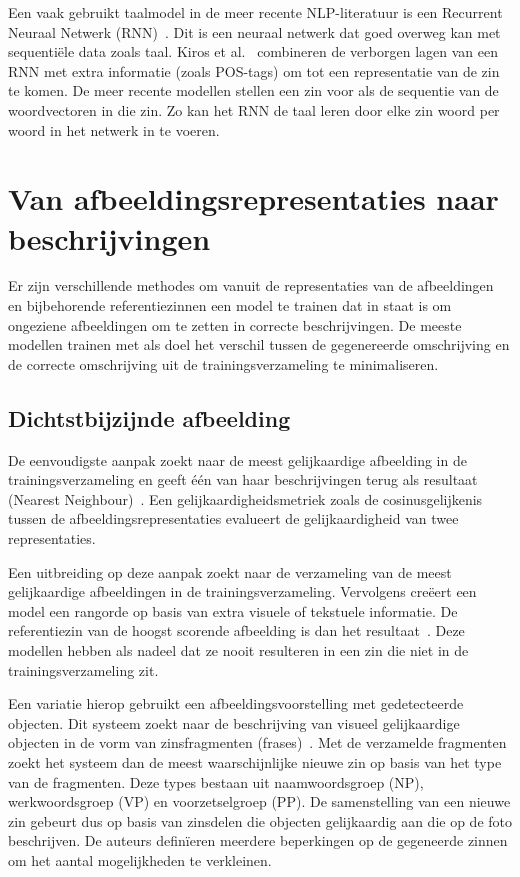  Een vaak gebruikt taalmodel in de meer recente NLP-literatuur is een Recurrent Neuraal Netwerk (RNN)~\cite{Mikolov2010}. Dit is een neuraal netwerk dat goed overweg kan met sequenti\"ele data zoals taal. Kiros et al.~\cite{Kiros2013} combineren de verborgen lagen van een RNN met extra informatie (zoals POS-tags) om tot een representatie van de zin te komen. De meer recente modellen stellen een zin voor als de sequentie van de woordvectoren in die zin. Zo kan het RNN de taal leren door elke zin woord per woord in het netwerk in te voeren.
 
\section{Van afbeeldingsrepresentaties naar beschrijvingen}
Er zijn verschillende methodes om vanuit de representaties van de afbeeldingen en bijbehorende referentiezinnen een model te trainen dat in staat is om ongeziene afbeeldingen om te zetten in correcte beschrijvingen. 
De meeste modellen trainen met als doel het verschil tussen de gegenereerde omschrijving en de correcte omschrijving uit de trainingsverzameling te minimaliseren.

\subsection{Dichtstbijzijnde afbeelding}
De eenvoudigste aanpak zoekt naar de meest gelijkaardige afbeelding in de trainingsverzameling en geeft \'e\'en van haar beschrijvingen terug als resultaat (Nearest Neighbour)~\cite{Devlin2015a}. Een gelijkaardigheidsmetriek zoals de cosinusgelijkenis tussen de afbeeldingsrepresentaties evalueert de gelijkaardigheid van twee representaties.

Een uitbreiding op deze aanpak zoekt naar de verzameling van de meest gelijkaardige afbeeldingen in de trainingsverzameling. Vervolgens cre\"eert een model een rangorde op basis van extra visuele of tekstuele informatie. De referentiezin van de hoogst scorende afbeelding is dan het resultaat~\cite{Devlin2015a,Hodosh2013,Oliva2006,Ordonez2011}. 
Deze modellen hebben als nadeel dat ze nooit resulteren in een zin die niet in de trainingsverzameling zit.

Een variatie hierop gebruikt een afbeeldingsvoorstelling met gedetecteerde objecten. Dit systeem zoekt naar de beschrijving van visueel gelijkaardige objecten in de vorm van zinsfragmenten (frases)~\cite{Gupta2012,Kuznetsova2012}. Met de verzamelde fragmenten zoekt het systeem dan de meest waarschijnlijke nieuwe zin op basis van het type van de fragmenten. Deze types bestaan uit naamwoordsgroep (NP), werkwoordsgroep (VP) en voorzetselgroep (PP). De samenstelling van een nieuwe zin gebeurt dus op basis van zinsdelen die objecten gelijkaardig aan die op de foto beschrijven. De auteurs defin\"ieren meerdere beperkingen op de gegeneerde zinnen om het aantal mogelijkheden te verkleinen.

